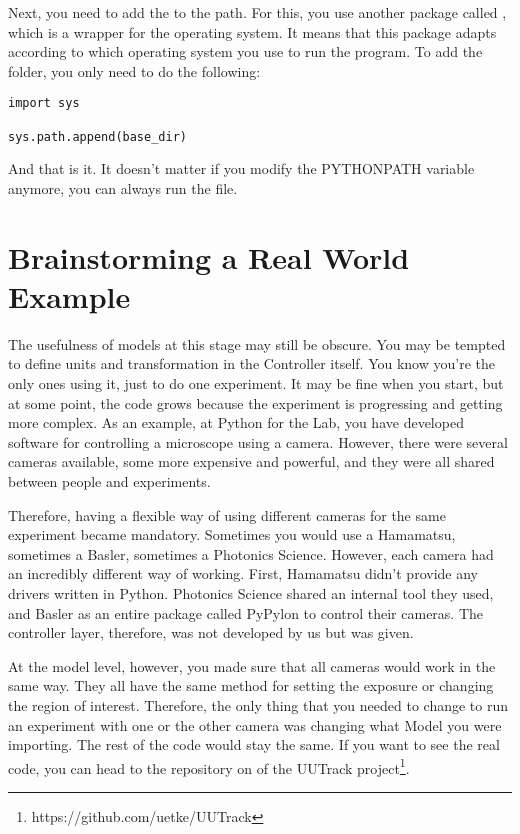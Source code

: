 Next, you need to add the  to the path. For this, you use another package called , which is a wrapper for the operating system. It means that this package adapts according to which operating system you use to run the program. To add the folder, you only need to do the following:

\begin{verbatim}
import sys

sys.path.append(base_dir)
\end{verbatim}

And that is it. It doesn't matter if you modify the PYTHONPATH variable anymore, you can always run the  file.


\section{Brainstorming a Real World Example}\label{sec:real-world-model}
The usefulness of models at this stage may still be obscure. You may be tempted to define units and transformation in the Controller itself. You know you're the only ones using it, just to do one experiment. It may be fine when you start, but at some point, the code grows because the experiment is progressing and getting more complex. As an example, at Python for the Lab, you have developed software for controlling a microscope using a camera. However, there were several cameras available, some more expensive and powerful, and they were all shared between people and experiments.

Therefore, having a flexible way of using different cameras for the same experiment became mandatory. Sometimes you would use a Hamamatsu, sometimes a Basler, sometimes a Photonics Science. However, each camera had an incredibly different way of working. First, Hamamatsu didn't provide any drivers written in Python. Photonics Science shared an internal tool they used, and Basler as an entire package called PyPylon to control their cameras. The controller layer, therefore, was not developed by us but was given.

At the model level, however, you made sure that all cameras would work in the same way. They all have the same method for setting the exposure or changing the region of interest. Therefore, the only thing that you needed to change to run an experiment with one or the other camera was changing what Model you were importing. The rest of the code would stay the same. If you want to see the real code, you can head to the repository on of the UUTrack project\footnote{https://github.com/uetke/UUTrack}.


